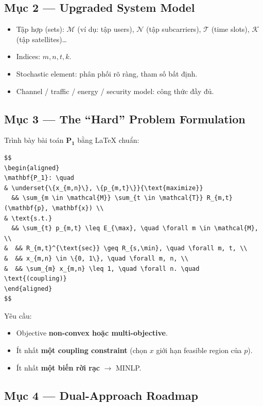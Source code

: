 \documentclass[11pt,a4paper]{article}
\begin{document}
\subsection{Mục 2 --- Upgraded System Model}
\begin{itemize}
  \item Tập hợp (sets): $\mathcal{M}$ (ví dụ: tập users), $\mathcal{N}$ (tập subcarriers), $\mathcal{T}$ (time slots), $\mathcal{K}$ (tập satellites)\dots
  \item Indices: $m, n, t, k$.
  \item Stochastic element: phân phối rõ ràng, tham số bất định.
  \item Channel / traffic / energy / security model: công thức đầy đủ.
\end{itemize}

\subsection{Mục 3 --- The ``Hard'' Problem Formulation}

Trình bày bài toán $\mathbf{P_1}$ bằng LaTeX chuẩn:

\begin{lstlisting}
$$
\begin{aligned}
\mathbf{P_1}: \quad
& \underset{\{x_{m,n}\}, \{p_{m,t}\}}{\text{maximize}}
  && \sum_{m \in \mathcal{M}} \sum_{t \in \mathcal{T}} R_{m,t}(\mathbf{p}, \mathbf{x}) \\
& \text{s.t.}
  && \sum_{t} p_{m,t} \leq E_{\max}, \quad \forall m \in \mathcal{M}, \\
&  && R_{m,t}^{\text{sec}} \geq R_{s,\min}, \quad \forall m, t, \\
&  && x_{m,n} \in \{0, 1\}, \quad \forall m, n, \\
&  && \sum_{m} x_{m,n} \leq 1, \quad \forall n. \quad \text{(coupling)}
\end{aligned}
$$
\end{lstlisting}

Yêu cầu:
\begin{itemize}
  \item Objective \textbf{non-convex hoặc multi-objective}.
  \item Ít nhất \textbf{một coupling constraint} (chọn $x$ giới hạn feasible region của $p$).
  \item Ít nhất \textbf{một biến rời rạc} $\rightarrow$ MINLP.
\end{itemize}

\subsection{Mục 4 --- Dual-Approach Roadmap}
\end{document}
